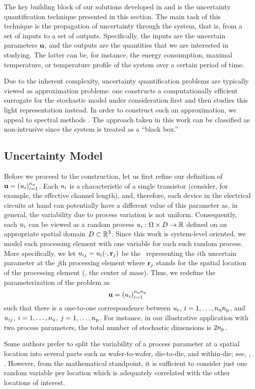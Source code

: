The key building block of our solutions developed in  and  is the uncertainty quantification technique presented in this section.
The main task of this technique is the propagation of uncertainty through the system, that is, from a set of inputs to a set of outputs.
Specifically, the inputs are the uncertain parameters $\mathbf{u}$, and the outputs are the quantities that we are interested in studying.
The latter can be, for instance, the energy consumption, maximal temperature, or temperature profile of the system over a certain period of time.

Due to the inherent complexity, uncertainty quantification problems are typically viewed as approximation problems: one constructs a computationally efficient surrogate for the stochastic model under consideration first and then studies this light representation instead.
In order to construct such an approximation, we appeal to spectral methods \cite{maitre2010, janson1997, eldred2008}.
The approach taken in this work can be classified as non-intrusive since the system is treated as a ``black box.''

\subsection{Uncertainty Model}
Before we proceed to the construction, let us first refine our definition of $\mathbf{u} = (u_i)_{i = 1}^{n_\text{u}}$.
Each $u_i$ is a characteristic of a single transistor (consider, for example, the effective channel length), and, therefore, each device in the electrical circuits at hand can potentially have a different value of this parameter as, in general, the variability due to process variation is not uniform.
Consequently, each $u_i$ can be viewed as a random process $u_i: \Omega \times D \to \mathbb{R}$ defined on an appropriate spatial domain $D \subset \mathbb{R}^3$.
Since this work is system-level oriented, we model each processing element with one variable for each such random process.
More specifically, we let $u_{ij} = u_i(\cdot, \mathbf{r}_j)$ be the \rv\ representing the $i$th uncertain parameter at the $j$th processing element where $\mathbf{r}_j$ stands for the spatial location of the processing element (\eg, the center of mass).
Thus, we redefine the parameterization of the problem as
\begin{equation} \elab{uncertain-parameters}
  \vu = (\u_i)_{i = 1}^{\nparams \nprocs}
\end{equation}
such that there is a one-to-one correspondence between $u_i$, $i = 1, \dots, {n_\text{u}} {n_\text{p}}$, and $u_{ij}$, $i = 1, \dots, {n_\text{u}}$, $j = 1, \dots, {n_\text{p}}$.
For instance, in our illustrative application with two process parameters, the total number of stochastic dimensions is $2 {n_\text{p}}$.
\begin{remark}
Some authors prefer to split the variability of a process parameter at a spatial location into several parts such as wafer-to-wafer, die-to-die, and within-die; see, \eg, \cite{juan2012}.
However, from the mathematical standpoint, it is sufficient to consider just one random variable per location which is adequately correlated with the other locations of interest.
\end{remark}

